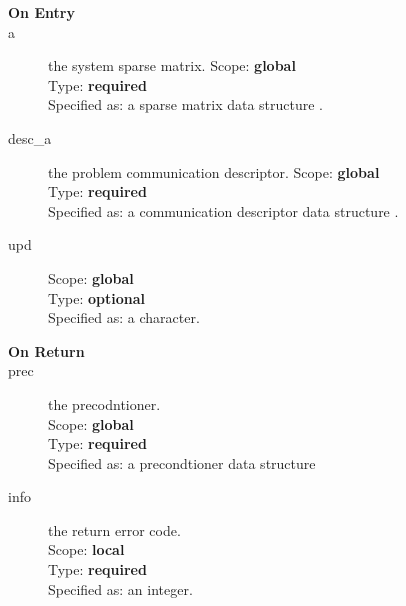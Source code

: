 

\begin{description}
\item[\bf On Entry]
\item[a] the system sparse matrix.
Scope: {\bf global} \\
Type: {\bf required}\\
Specified as: a sparse matrix data structure \spdata.
\item[desc\_a] the problem communication descriptor. 
Scope: {\bf global} \\
Type: {\bf required}\\
Specified as: a communication descriptor data structure \descdata.
\item[upd] 
Scope: {\bf global} \\
Type: {\bf optional}\\
Specified as: a character.
\end{description}

\begin{description}
\item[\bf On Return]
\item[prec] the precodntioner.\\
Scope: {\bf global} \\
Type: {\bf required}\\
Specified as: a precondtioner data structure \precdata\\
\item[info] the return error code.\\
Scope: {\bf local} \\
Type: {\bf required}\\
Specified as: an integer.\\
\end{description}





